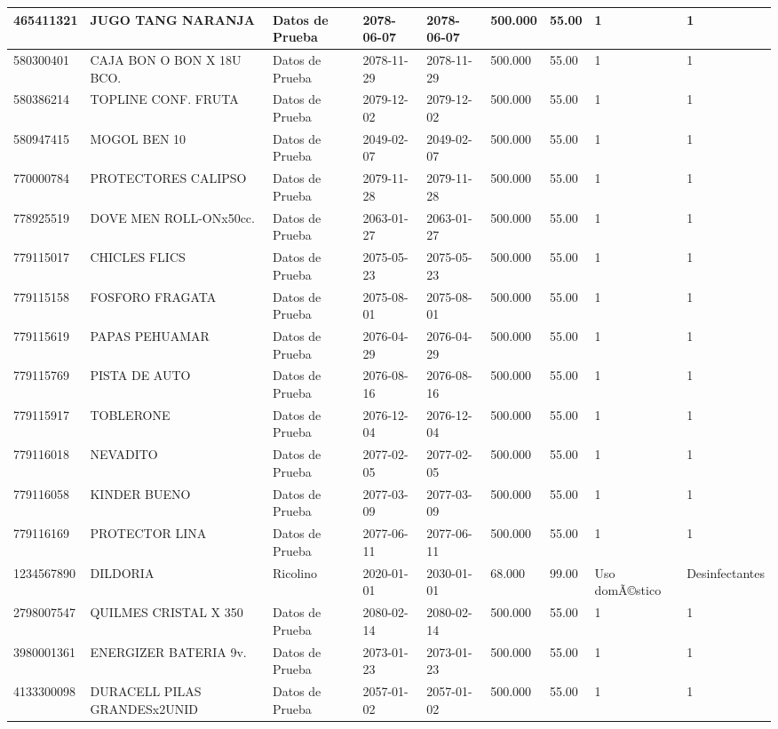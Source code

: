 \documentclass[a4paper,12pt]{article}
\begin{document}
\begin{landscape}
\begin{longtable}{|p{4cm}|p{2.5cm}|p{2.5cm}|p{1.8cm}|p{1.8cm}|p{1cm}|p{1cm}|p{3cm}|p{3cm}||}
465411321 & JUGO TANG NARANJA & Datos de Prueba & 2078-06-07 & 2078-06-07 & 500.000 & 55.00 & 1 & 1 \\ \hline 
580300401 & CAJA BON O BON X 18U  BCO. & Datos de Prueba & 2078-11-29 & 2078-11-29 & 500.000 & 55.00 & 1 & 1 \\ \hline 
580386214 & TOPLINE CONF. FRUTA & Datos de Prueba & 2079-12-02 & 2079-12-02 & 500.000 & 55.00 & 1 & 1 \\ \hline 
580947415 & MOGOL BEN 10 & Datos de Prueba & 2049-02-07 & 2049-02-07 & 500.000 & 55.00 & 1 & 1 \\ \hline 
770000784 & PROTECTORES CALIPSO & Datos de Prueba & 2079-11-28 & 2079-11-28 & 500.000 & 55.00 & 1 & 1 \\ \hline 
778925519 & DOVE MEN ROLL-ONx50cc. & Datos de Prueba & 2063-01-27 & 2063-01-27 & 500.000 & 55.00 & 1 & 1 \\ \hline 
779115017 & CHICLES FLICS & Datos de Prueba & 2075-05-23 & 2075-05-23 & 500.000 & 55.00 & 1 & 1 \\ \hline 
779115158 & FOSFORO FRAGATA & Datos de Prueba & 2075-08-01 & 2075-08-01 & 500.000 & 55.00 & 1 & 1 \\ \hline 
779115619 & PAPAS PEHUAMAR & Datos de Prueba & 2076-04-29 & 2076-04-29 & 500.000 & 55.00 & 1 & 1 \\ \hline 
779115769 & PISTA DE AUTO & Datos de Prueba & 2076-08-16 & 2076-08-16 & 500.000 & 55.00 & 1 & 1 \\ \hline 
779115917 & TOBLERONE & Datos de Prueba & 2076-12-04 & 2076-12-04 & 500.000 & 55.00 & 1 & 1 \\ \hline 
779116018 & NEVADITO & Datos de Prueba & 2077-02-05 & 2077-02-05 & 500.000 & 55.00 & 1 & 1 \\ \hline 
779116058 & KINDER BUENO & Datos de Prueba & 2077-03-09 & 2077-03-09 & 500.000 & 55.00 & 1 & 1 \\ \hline 
779116169 & PROTECTOR LINA & Datos de Prueba & 2077-06-11 & 2077-06-11 & 500.000 & 55.00 & 1 & 1 \\ \hline 
1234567890 & DILDORIA & Ricolino & 2020-01-01 & 2030-01-01 & 68.000 & 99.00 & Uso domÃ©stico & Desinfectantes \\ \hline 
2798007547 & QUILMES CRISTAL X 350 & Datos de Prueba & 2080-02-14 & 2080-02-14 & 500.000 & 55.00 & 1 & 1 \\ \hline 
3980001361 & ENERGIZER BATERIA 9v. & Datos de Prueba & 2073-01-23 & 2073-01-23 & 500.000 & 55.00 & 1 & 1 \\ \hline 
4133300098 & DURACELL PILAS GRANDESx2UNID & Datos de Prueba & 2057-01-02 & 2057-01-02 & 500.000 & 55.00 & 1 & 1 \\ \hline 

\end{longtable}
\end{landscape}
\end{document}
